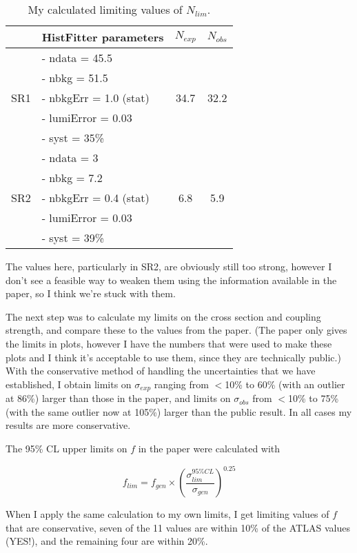 \begin{flushleft}
\begin{table}
\begin{center}
\begin{tabular}{| c | l | c | c |}
\hline
 & HistFitter parameters& $N_{exp}$ & $N_{obs}$ \\
 \hline
 & - ndata = 45.5 & & \\
 & - nbkg = 51.5 & & \\
 SR1 & - nbkgErr = 1.0 (stat) & 34.7 & 32.2 \\
 & - lumiError = 0.03 & & \\
 & - syst = 35\% & & \\
\hline
& - ndata = 3 & & \\
& - nbkg = 7.2 & & \\
SR2 & - nbkgErr = 0.4 (stat) & 6.8 & 5.9 \\
& - lumiError = 0.03 & & \\
& - syst = 39\% & & \\
\hline
\end{tabular}
\end{center}
\caption{My calculated limiting values of $N_{lim}$.}
\end{table}

\bigskip
The values here, particularly in SR2, are obviously still too strong, however I don't see a feasible way to weaken them using the information available in the paper, so I think we're stuck with them.

\bigskip
The next step was to calculate my limits on the cross section and coupling strength, and compare these to the values from the paper. (The paper only gives the limits in plots, however I have the numbers that were used to make these plots and I think it's acceptable to use them, since they are technically public.) With the conservative method of handling the uncertainties that we have established, I obtain limits on $\sigma_{exp}$ ranging from $<$10\% to 60\% (with an outlier at 86\%) larger than those in the paper, and limits on $\sigma_{obs}$ from $<$10\% to 75\% (with the same outlier now at 105\%) larger than the public result. In all cases my results are more conservative.

\bigskip
The 95\% CL upper limits on $f$ in the paper were calculated with

\begin{equation}
f_{lim} = f_{gen} \times \left ( \frac{\sigma_{lim}^{95\%CL}}{\sigma_{gen}} \right )^{0.25}
\end{equation}

When I apply the same calculation to my own limits, I get limiting values of $f$ that are conservative, seven of the 11 values are within 10\% of the ATLAS values (YES!), and the remaining four are within 20\%.


\end{flushleft}
